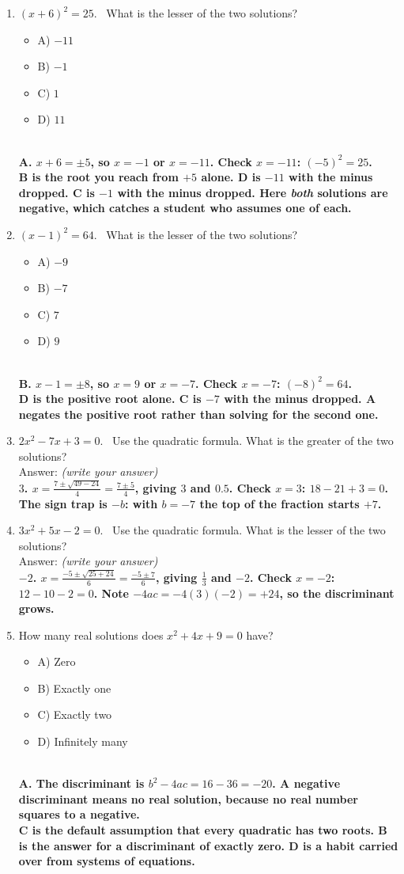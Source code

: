 \documentclass[11pt,a4paper]{article}
\newcommand{\spr}{\\[3pt]\hspace*{6pt}Answer: \underline{\hspace{3.2cm}}\hfill{\footnotesize\itshape(write your answer)}}
\newcommand{\ans}[1]{\ {\color{keyred}\bfseries #1}}
\newcommand{\ans}[1]{}
\newenvironment{choices}
  {\par\nopagebreak\begin{itemize}[label={},leftmargin=16pt,itemsep=0pt,topsep=2pt,parsep=0pt,%
     beginpenalty=10000,midpenalty=10000]}
  {\end{itemize}}
\begin{document}
\begin{enumerate}[leftmargin=20pt,itemsep=9pt]
\item $(x+6)^2=25$. \ What is the lesser of the two solutions?
  \begin{choices}
  \item A) $-11$
  \item B) $-1$
  \item C) $1$
  \item D) $11$
  \end{choices}
  \ans{\\ A. $x+6=\pm5$, so $x=-1$ or $x=-11$. Check $x=-11$: $(-5)^2=25$. \\ B is the root you reach from $+5$ alone. D is $-11$ with the minus dropped. C is $-1$ with the minus dropped. Here \emph{both} solutions are negative, which catches a student who assumes one of each.}

\item $(x-1)^2=64$. \ What is the lesser of the two solutions?
  \begin{choices}
  \item A) $-9$
  \item B) $-7$
  \item C) $7$
  \item D) $9$
  \end{choices}
  \ans{\\ B. $x-1=\pm8$, so $x=9$ or $x=-7$. Check $x=-7$: $(-8)^2=64$. \\ D is the positive root alone. C is $-7$ with the minus dropped. A negates the positive root rather than solving for the second one.}

\item $2x^2-7x+3=0$. \ Use the quadratic formula. What is the greater of the two solutions? \spr
  \ans{\\ $3$. $x=\frac{7\pm\sqrt{49-24}}{4}=\frac{7\pm5}{4}$, giving $3$ and $0.5$. Check $x=3$: $18-21+3=0$. The sign trap is $-b$: with $b=-7$ the top of the fraction starts $+7$.}

\item $3x^2+5x-2=0$. \ Use the quadratic formula. What is the lesser of the two solutions? \spr
  \ans{\\ $-2$. $x=\frac{-5\pm\sqrt{25+24}}{6}=\frac{-5\pm7}{6}$, giving $\tfrac13$ and $-2$. Check $x=-2$: $12-10-2=0$. Note $-4ac=-4(3)(-2)=+24$, so the discriminant grows.}

\item How many real solutions does $x^2+4x+9=0$ have?
  \begin{choices}
  \item A) Zero
  \item B) Exactly one
  \item C) Exactly two
  \item D) Infinitely many
  \end{choices}
  \ans{\\ A. The discriminant is $b^2-4ac=16-36=-20$. A negative discriminant means no real solution, because no real number squares to a negative. \\ C is the default assumption that every quadratic has two roots. B is the answer for a discriminant of exactly zero. D is a habit carried over from systems of equations.}


\end{enumerate}
\end{document}
